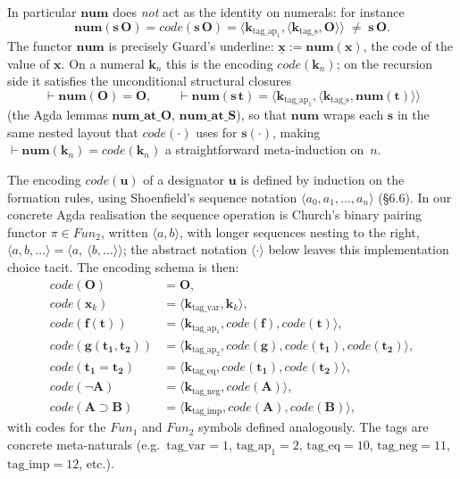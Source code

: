 \documentclass[11pt]{article}
\theoremstyle{plain}
\theoremstyle{definition}
\theoremstyle{remark}
\newcommand{\code}[1]{\mathit{code}(#1)}
\newcommand{\num}{\mathbf{num}}
\newcommand{\seq}[1]{\langle #1 \rangle}
\newcommand{\Fun}{\mathit{Fun}}
\begin{document}
In particular $\num$ does \emph{not} act as the identity on numerals:
for instance
\[
\num(\mathbf{s}\,\mathbf{O}) = \code{\mathbf{s}\,\mathbf{O}} = \seq{\mathbf{k}_{\mathrm{tag\_ap_1}}, \seq{\mathbf{k}_{\mathrm{tag\_s}}, \mathbf{O}}} \;\neq\; \mathbf{s}\,\mathbf{O}.
\]
The functor $\num$ is precisely Guard's underline:
$\underline{\mathbf{x}} := \num(\mathbf{x})$, the code of the value of
$\mathbf{x}$.  On a numeral $\mathbf{k}_n$ this is the encoding
$\code{\mathbf{k}_n}$; on the recursion side it satisfies the
unconditional structural closures
\[
\vdash \num(\mathbf{O}) = \mathbf{O}, \qquad
\vdash \num(\mathbf{s}\,\mathbf{t}) = \seq{\mathbf{k}_{\mathrm{tag\_ap_1}}, \seq{\mathbf{k}_{\mathrm{tag\_s}}, \num(\mathbf{t})}}
\]
(the Agda lemmas $\mathbf{num\_at\_O}$, $\mathbf{num\_at\_S}$), so that
$\num$ wraps each $\mathbf{s}$ in the same nested layout that
$\code{\cdot}$ uses for $\mathbf{s}(\cdot)$, making
$\vdash \num(\mathbf{k}_n) = \code{\mathbf{k}_n}$ a straightforward
meta-induction on~$n$.

The encoding $\code{\mathbf{u}}$ of a designator $\mathbf{u}$ is
defined by induction on the formation rules, using Shoenfield's
sequence notation $\seq{a_0, a_1, \ldots, a_n}$ ({\S}6.6).  In our
concrete Agda realisation the sequence operation is Church's binary
pairing functor $\pi \in \Fun_2$, written $\seq{a, b}$, with longer
sequences nesting to the right, $\seq{a, b, \ldots} = \seq{a,\ \seq{b, \ldots}}$;
the abstract notation $\seq{\cdot}$ below leaves this implementation
choice tacit.  The encoding schema is then:
\begin{align*}
\code{\mathbf{O}}              &= \mathbf{O}, \\
\code{\mathbf{x}_k}            &= \seq{\mathbf{k}_{\mathrm{tag\_var}}, \mathbf{k}_k}, \\
\code{\mathbf{f}(\mathbf{t})}  &= \seq{\mathbf{k}_{\mathrm{tag\_ap_1}}, \code{\mathbf{f}}, \code{\mathbf{t}}}, \\
\code{\mathbf{g}(\mathbf{t_1}, \mathbf{t_2})} &= \seq{\mathbf{k}_{\mathrm{tag\_ap_2}}, \code{\mathbf{g}}, \code{\mathbf{t_1}}, \code{\mathbf{t_2}}}, \\
\code{\mathbf{t_1} = \mathbf{t_2}} &= \seq{\mathbf{k}_{\mathrm{tag\_eq}}, \code{\mathbf{t_1}}, \code{\mathbf{t_2}}}, \\
\code{\neg \mathbf{A}}         &= \seq{\mathbf{k}_{\mathrm{tag\_neg}}, \code{\mathbf{A}}}, \\
\code{\mathbf{A} \supset \mathbf{B}} &= \seq{\mathbf{k}_{\mathrm{tag\_imp}}, \code{\mathbf{A}}, \code{\mathbf{B}}},
\end{align*}
with codes for the $\Fun_1$ and $\Fun_2$ symbols defined analogously.
The tags are concrete meta-naturals (e.g.\ $\mathrm{tag\_var}=1$,
$\mathrm{tag\_ap_1}=2$, $\mathrm{tag\_eq}=10$, $\mathrm{tag\_neg}=11$,
$\mathrm{tag\_imp}=12$, etc.).
\end{document}
